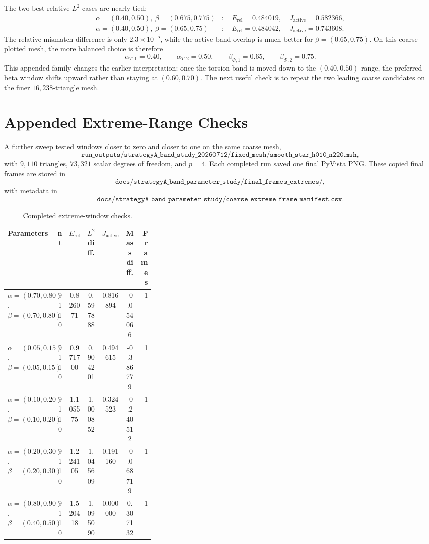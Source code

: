 \documentclass[11pt]{article}
\begin{document}
The two best relative-\(L^2\) cases are nearly tied:
\[
\begin{aligned}
\alpha=(0.40,0.50),\ \beta=(0.675,0.775)
&:\quad E_{\mathrm{rel}}=0.484019,\quad J_{\mathrm{active}}=0.582366,\\
\alpha=(0.40,0.50),\ \beta=(0.65,0.75)
&:\quad E_{\mathrm{rel}}=0.484042,\quad J_{\mathrm{active}}=0.743608.
\end{aligned}
\]
The relative mismatch difference is only \(2.3\times 10^{-5}\), while the
active-band overlap is much better for \(\beta=(0.65,0.75)\).  On this
coarse plotted mesh, the more balanced choice is therefore
\[
\alpha_{T,1}=0.40,\qquad
\alpha_{T,2}=0.50,\qquad
\beta_{\Phi,1}=0.65,\qquad
\beta_{\Phi,2}=0.75.
\]
This appended family changes the earlier interpretation: once the torsion band
is moved down to the \((0.40,0.50)\) range, the preferred beta window shifts
upward rather than staying at \((0.60,0.70)\).  The next useful check is to
repeat the two leading coarse candidates on the finer \(16{,}238\)-triangle
mesh.

\section{Appended Extreme-Range Checks}

A further sweep tested windows closer to zero and closer to one on the same
coarse mesh,
\[
\texttt{run\_outputs/strategyA\_band\_study\_20260712/fixed\_mesh/smooth\_star\_h010\_n220.msh},
\]
with \(9{,}110\) triangles, \(73{,}321\) scalar degrees of freedom, and \(p=4\).
Each completed run saved one final PyVista PNG.  These copied final frames are
stored in
\[
\texttt{docs/strategyA\_band\_parameter\_study/final\_frames\_extremes/},
\]
with metadata in
\[
\texttt{docs/strategyA\_band\_parameter\_study/coarse\_extreme\_frame\_manifest.csv}.
\]

\begin{table}[h]
\centering
\scriptsize
\begin{tabular}{@{}>{\raggedright\arraybackslash}p{0.34\linewidth}
                r
                S[table-format=1.6]
                S[table-format=1.6]
                S[table-format=1.6]
                S[table-format=-1.6]
                r@{}}
\toprule
Parameters & {nt} & {$E_{\mathrm{rel}}$} & {$L^2$ diff.} & {$J_{\mathrm{active}}$} & {Mass diff.} & {Frames} \\
\midrule
\(\alpha=(0.70,0.80)\), \(\beta=(0.70,0.80)\) & 9110 & 0.826071 & 0.597888 & 0.816894 & -0.054066 & 1 \\
\(\alpha=(0.05,0.15)\), \(\beta=(0.05,0.15)\) & 9110 & 0.971700 & 0.904201 & 0.494615 & -0.386779 & 1 \\
\(\alpha=(0.10,0.20)\), \(\beta=(0.10,0.20)\) & 9110 & 1.105575 & 1.000852 & 0.324523 & -0.240512 & 1 \\
\(\alpha=(0.20,0.30)\), \(\beta=(0.20,0.30)\) & 9110 & 1.224105 & 1.045609 & 0.191160 & -0.068719 & 1 \\
\(\alpha=(0.80,0.90)\), \(\beta=(0.40,0.50)\) & 9110 & 1.520418 & 1.095090 & 0.000000 & 0.307132 & 1 \\
\bottomrule
\end{tabular}
\caption{Completed extreme-window checks.}
\end{table}
\end{document}
